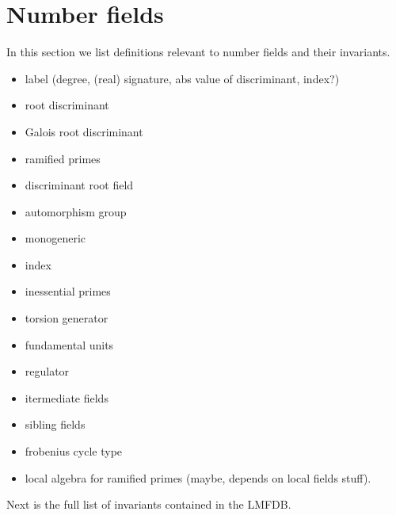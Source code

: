
\chapter{Number fields}

In this section we list definitions relevant to number fields and their invariants.
\begin{itemize}
    \item label (degree, (real) signature, abs value of discriminant, index?)
    \item root discriminant
    \item Galois root discriminant
    \item ramified primes
    \item discriminant root field
    \item automorphism group
    \item monogeneric
    \item index
    \item inessential primes
    \item torsion generator
    \item fundamental units
    \item regulator
    \item itermediate fields
    \item sibling fields
    \item frobenius cycle type
    \item local algebra for ramified primes (maybe, depends on local fields stuff).
    \end{itemize}

Next is the full list of invariants contained in the LMFDB.

